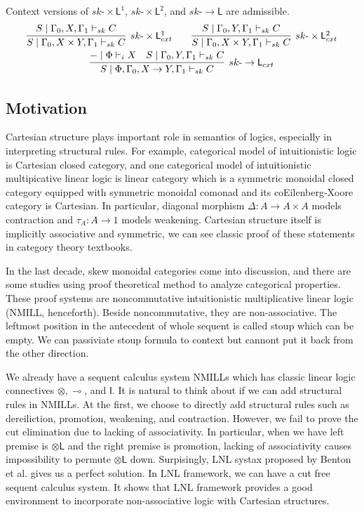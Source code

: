 \documentclass{article}
\newcommand{\tl}{\otimes \mathsf{L}}
\newcommand{\ot}{\otimes}
\newcommand{\lolli}{\multimap}
\newcommand{\I}{\mathsf{I}}
\newcommand{\td}{\text{-}}
\newcommand{\tms}{\times}
\newcommand{\tmslf}{\times \mathsf{L}^{1}}
\newcommand{\tmsls}{\times \mathsf{L}^{2}}
\newcommand{\rar}{\rightarrow}
\newcommand{\rarl}{\rightarrow \mathsf{L}}
\begin{document}
  Context versions of $sk\td \tmslf$, $sk\td \tmsls$, and $sk\td\rarl$ are admissible.
  \begin{displaymath}
    \begin{array}{cc}
      \infer[sk\td\tmslf_{cxt}]{S \mid \Gamma_{0} , X \tms Y , \Gamma_{1} \vdash_{sk} C}{S \mid \Gamma_{0} , X , \Gamma_{1} \vdash_{sk} C}
      \qquad
      \infer[sk\td\tmsls_{cxt}]{S \mid \Gamma_{0} , X \tms Y , \Gamma_{1} \vdash_{sk} C}{S \mid \Gamma_{0} , Y , \Gamma_{1} \vdash_{sk} C}
      \\
      \infer[sk\td\rarl_{cxt}]{S \mid \Phi , \Gamma_{0} , X \rar Y , \Gamma_{1} \vdash_{sk} C}{
        \deduce{- \mid \Phi \vdash_{i} X}{}
        &
        \deduce{S \mid \Gamma_{0} , Y , \Gamma_{1} \vdash_{sk} C}{}
      }
    \end{array}
  \end{displaymath}

  \subsection*{Motivation}
  Cartesian structure plays important role in semantics of logics, especially in interpreting structural rules.
  For example, categorical model of intuitionistic logic is Cartesian closed category, and one categorical model of intuitionistic multipicative linear logic is linear category which is a symmetric monoidal closed category equipped with symmetric monoidal comonad and its coEilenberg-Xoore category is Cartesian.
  In particular, diagonal morphism $\Delta : A \longrightarrow A\times A$ models contraction and $\tau_A : A \longrightarrow 1$ models weakening.
  Cartesian structure itself is implicitly associative and symmetric, we can see classic proof of these statements in category theory textbooks.

  In the last decade, skew monoidal categories come into discussion, and there are some studies using proof theoretical method to analyze categorical properties.
  These proof systems are noncommutative intuitionistic multiplicative linear logic (NMILL, henceforth).
  Beside noncommutative, they are non-associative.
  The leftmost position in the antecedent of whole sequent is called stoup which can be empty.
  We can passiviate stoup formula to context but cannont put it back from the other direction.

  We already have a sequent calculus system NMILLs which has classic linear logic connectives $\ot , \lolli$, and $\I$.
  It is natural to think about if we can add structural rules in NMILLs.
  At the first, we choose to directly add structural rules such as dereiliction, promotion, weakening, and contraction.
  However, we fail to prove the cut elimination due to lacking of associativity.
  In particular, when we have left premise is $\tl$ and the right premise is promotion, lacking of associativity causes impossibility to permute $\tl$ down.
  Surpisingly, LNL systax proposed by Benton et al. gives us a perfect solution.
  In LNL framework, we can have a cut free sequent calculus system.
  It shows that LNL framework provides a good environment to incorporate non-associative logic with Cartesian structures.
\end{document}
